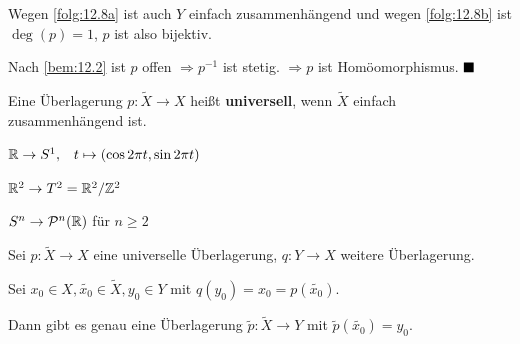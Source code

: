 \begin{beweis}
    Wegen \cref{folg:12.8a} ist auch $Y$ einfach zusammenhängend
    und wegen \cref{folg:12.8b} ist $\deg(p)=1$, $p$ ist also
    bijektiv.

    Nach \cref{bem:12.2} ist $p$ offen $\Rightarrow p^{-1}$
    ist stetig. $\Rightarrow p$ ist Homöomorphismus.  $\qed$
\end{beweis}

\begin{definition}%
    Eine Überlagerung $p: \tilde{X} \rightarrow X$ heißt
    \textbf{universell}, wenn
    $\tilde{X}$ einfach zusammenhängend ist.
\end{definition}

\begin{beispiel}
    $\mathbb{R} \rightarrow S^1, \;\;\; t \mapsto (\cos 2 \pi t, \sin 2 \pi t)$

    $\mathbb{R}^2 \rightarrow T^2 = \mathbb{R}^2 / \mathbb{Z}^2$

    $S^n \rightarrow \mathcal{P}^n(\mathbb{R})$ für $n \geq 2$
\end{beispiel}

\begin{satz}\label{thm:12.11}%
    Sei $p: \tilde{X} \rightarrow X$ eine universelle Überlagerung,
    $q:Y \rightarrow X$ weitere Überlagerung.

    Sei $x_0 \in X, \tilde{x_0} \in \tilde{X}, y_0 \in Y$ mit
    $q(y_0) = x_0 = p(\tilde{x_0})$.

    Dann gibt es genau eine Überlagerung $\tilde{p}: \tilde{X} \rightarrow Y$
    mit $\tilde{p}(\tilde{x_0}) = y_0$.
\end{satz}

